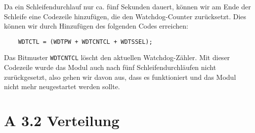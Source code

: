\documentclass[11pt,a4paper,ngerman]{article}
\begin{document}
\begin{description}
	Da ein Schleifendurchlauf nur ca. fünf Sekunden dauert, können wir am Ende der Schleife eine Codezeile hinzufügen, die den Watchdog-Counter zurücksetzt. Dies können wir durch Hinzufügen des folgenden Codes erreichen:
	
	\begin{lstlisting}
	WDTCTL = (WDTPW + WDTCNTCL + WDTSSEL);
	\end{lstlisting}
	Das Bitmuster \texttt{WDTCNTCL} löscht den aktuellen Watchdog-Zähler.
	Mit dieser Codezeile wurde das Modul auch nach fünf Schleifendurchläufen nicht zurückgesetzt, also gehen wir davon aus, dass es funktioniert und das Modul nicht mehr neugestartet werden sollte.
	
\end{description}

\newpage
\section*{A 3.2 Verteilung}
\end{document}
